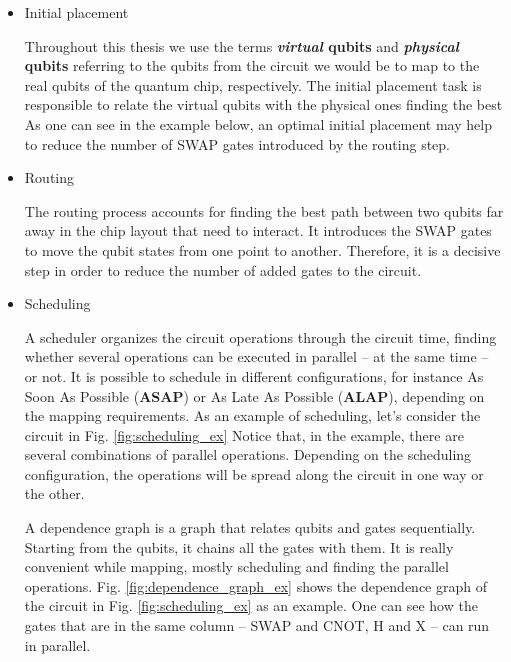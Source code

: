 \begin{itemize}
\item Initial placement
\label{sec:orgc21564f}

Throughout this thesis we use the terms \textbf{\emph{virtual} qubits} and \textbf{\emph{physical} qubits} referring to the qubits from the circuit we would be to map to the real qubits of the quantum chip, respectively.
The initial placement task is responsible to relate the virtual qubits with the physical ones finding the best 
As one can see in the example below, an optimal initial placement may help to reduce the number of SWAP gates introduced by the routing step.

\item Routing
\label{sec:orgfa05c86}

The routing process accounts for finding the best path between two qubits far away in the chip layout that need to interact.
It introduces the SWAP gates to move the qubit states from one point to another.
Therefore, it is a decisive step in order to reduce the number of added gates to the circuit.

\item Scheduling
\label{sec:org59d3225}

A scheduler organizes the circuit operations through the circuit time,
finding whether several operations can be executed in parallel -- at the same time -- or not.
It is possible to schedule in different configurations, for instance As Soon As Possible (\textbf{ASAP}) or As Late As Possible (\textbf{ALAP}), depending on the mapping requirements.
As an example of scheduling, let's consider the circuit in Fig. \ref{fig:scheduling_ex}
Notice that, in the example, there are several combinations of parallel operations.
Depending on the scheduling configuration,
the operations will be spread along the circuit in one way or the other.

A dependence graph is a graph that relates qubits and gates sequentially.
Starting from the qubits, it chains all the gates with them.
It is really convenient while mapping, mostly scheduling and finding the parallel operations.
Fig. \ref{fig:dependence_graph_ex} shows the dependence graph of the circuit in Fig. \ref{fig:scheduling_ex} as an example.
One can see how the gates that are in the same column -- SWAP and CNOT, H and X -- can run in parallel.
\end{itemize}


